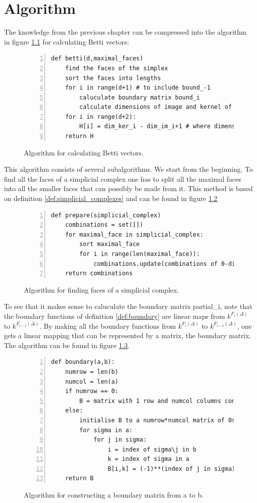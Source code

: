 \documentclass[11pt,a4paper,twoside]{report}
\begin{document}
\chapter{Algorithm}\label{ch:algorithm}
The knowledge from the previous chapter can be compressed into the algorithm in figure \ref{fig:Algorithm} for calculating Betti vectors:
\begin{figure}[H]
\begin{lstlisting}[numbers=left]
def betti(d,maximal_faces)
    find the faces of the simplex 
    sort the faces into lengths
    for i in range(d+1) # to include bound_-1
        caluculate boundary matrix bound_i
        calculate dimensions of image and kernel of bound_i
    for i in range(d+2):
        H[i] = dim_ker_i - dim_im_i+1 # where dimensions are 0 if not calculated
    return H
\end{lstlisting}
\caption{Algorithm for calculating Betti vectors.}
\label{fig:Algorithm}
\end{figure}
This algorithm consists of several subalgorithms. We start from the beginning. To find all the faces of a simplicial complex one has to split all the maximal faces into all the smaller faces that can possibly be made from it. This method is based on definition \ref{def:simplicial_complexes} and can be found in figure \ref{fig:Algorithm_faces}
\begin{figure}[H]
\begin{lstlisting}[numbers=left]
def prepare(simplicial_complex)
    combinations = set([])
    for maximal_face in simplicial_complex:
    	sort maximal_face
        for i in range(len(maximal_face)):
            combinations.update(combinations of 0-dimensional faces in maximal_face of length i)
    return combinations    
\end{lstlisting}
\caption{Algorithm for finding faces of a simplicial complex.}
\label{fig:Algorithm_faces}
\end{figure}
To see that it makes sense to caluculate the boundary matrix partial\_i, note that the boundary functions of definition \ref{def:boundary} are linear maps from $k^{F_i(\Delta)}$ to $k^{F_{i-1}(\Delta)}$. By making all the boundary functions from $k^{F_i(\Delta)}$ to $k^{F_{i-1}(\Delta)}$, one gets a linear mapping that can be represented by a matrix, the boundary matrix. The algorithm can be found in figure \ref{fig:Algorithm_matrix}.
\begin{figure}[H]
\begin{lstlisting}[numbers=left]
def boundary(a,b):
    numrow = len(b)
    numcol = len(a)
    if numrow == 0:
        B = matrix with 1 row and numcol columns consisting of 1s
    else:
        initialise B to a numrow*numcol matrix of 0s 
        for sigma in a:
            for j in sigma:
                i = index of sigma\j in b
                k = index of sigma in a
                B[i,k] = (-1)**(index of j in sigma) 
    return B
\end{lstlisting}
\caption{Algorithm for constructing a boundary matrix from a to b.}
\label{fig:Algorithm_matrix}
\end{figure}
\end{document}
